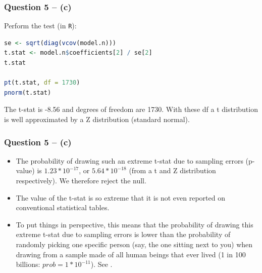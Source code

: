 \documentclass[xcolor=table]{beamer}
\begin{document}
\begin{frame}[fragile]
\frametitle{Question 5 -- (c)}
Perform the test (in \texttt{R}):
\begin{lstlisting}[language = R]
se <- sqrt(diag(vcov(model.n)))
t.stat <- model.n$coefficients[2] / se[2]
t.stat

pt(t.stat, df = 1730)
pnorm(t.stat)
\end{lstlisting} \pause

The t-stat is -8.56 and degrees of freedom are 1730. With these df a t distribution is well approximated by a Z distribution (standard normal).
\end{frame}

\begin{frame}
\frametitle{Question 5 -- (c)}
\begin{itemize}
\item The probability of drawing such an extreme t-stat due to sampling errors (p-value) is $1.23 * 10^{-17}$, or $5.64 * 10^{-18}$ (from a t and Z distribution respectively). \pause We therefore reject the null.

\item The value of the t-stat is so extreme that it is not even reported on conventional statistical tables. \pause

\item To put things in perspective, this means that the probability of drawing this extreme t-stat due to sampling errors is lower than the probability of randomly picking one specific person (say, the one sitting next to you) when drawing from a sample made of all human beings that ever lived (1 in 100 billions: $prob = 1 * 10^{-11}$). See \cite{PRB}.

\end{itemize}
\end{frame}


\begin{frame}


\end{frame}
\end{document}
